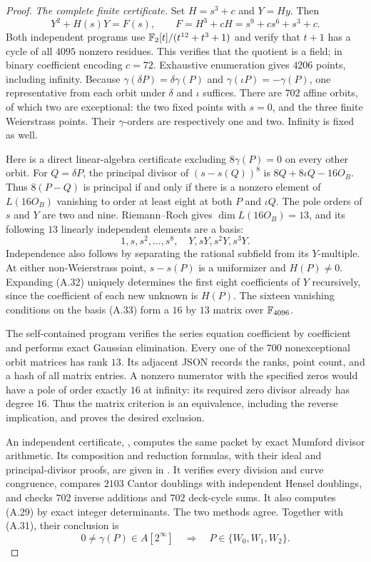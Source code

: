\begin{proof}
\emph{The complete finite certificate.}
Set $H=s^3+c$ and $Y=Hy$. Then
\[
 Y^2+H(s)Y=F(s),\qquad
 F=H^3+cH=s^9+c s^6+s^3+c.                              \tag{A.32}
\]
Both independent programs use
$\mathbb F_2[t]/(t^{12}+t^3+1)$ and verify that $t+1$ has a
cycle of all $4095$ nonzero residues. This verifies that
the quotient is a field; in binary coefficient encoding
$c=72$. Exhaustive enumeration gives $4206$ points,
including infinity. Because $\gamma(\delta P)=\delta\gamma(P)$
and $\gamma(\iota P)=-\gamma(P)$, one representative
from each orbit under $\delta$ and $\iota$ suffices.
There are $702$ affine orbits, of which two are exceptional:
the two fixed points with $s=0$, and the three finite
Weierstrass points. Their $\gamma$-orders are respectively
one and two. Infinity is fixed as well.

Here is a direct linear-algebra certificate excluding
$8\gamma(P)=0$ on every other orbit. For $Q=\delta P$,
the principal divisor of $(s-s(Q))^8$ is
$8Q+8\iota Q-16O_B$. Thus $8(P-Q)$ is principal
if and only if there is a nonzero element of
$L(16O_B)$ vanishing to order at least eight at both
$P$ and $\iota Q$. The pole orders of $s$ and $Y$ are
two and nine. Riemann--Roch gives $\dim L(16O_B)=13$,
and its following $13$ linearly independent elements
are a basis:
\[
 1,s,s^2,\ldots,s^8,\quad Y,sY,s^2Y,s^3Y.              \tag{A.33}
\]
Independence also follows by separating the rational
subfield from its $Y$-multiple. At either non-Weierstrass
point, $s-s(P)$ is a uniformizer and $H(P)\ne0$.
Expanding (A.32) uniquely determines the first eight
coefficients of $Y$ recursively, since the coefficient
of each new unknown is $H(P)$. The sixteen vanishing
conditions on the basis (A.33) form a $16$ by $13$
matrix over $\mathbb F_{4096}$.

The self-contained program
 verifies
the series equation coefficient by coefficient and
performs exact Gaussian elimination. Every one of the
$700$ nonexceptional orbit matrices has rank $13$.
Its adjacent JSON records the ranks, point count, and
a hash of all matrix entries. A nonzero numerator with
the specified zeros would have a pole of order exactly
$16$ at infinity: its required zero divisor already
has degree $16$. Thus the matrix criterion is an
equivalence, including the reverse implication, and
proves the desired exclusion.

An independent certificate,
, computes the
same packet by exact Mumford divisor arithmetic. Its
composition and reduction formulas, with their ideal
and principal-divisor proofs, are given in
. It verifies
every division and curve congruence, compares $2103$
Cantor doublings with independent Hensel doublings,
and checks $702$ inverse additions and $702$ deck-cycle
sums. It also computes (A.29) by exact integer
determinants. The two methods agree. Together with
(A.31), their conclusion is
\[
 0\ne\gamma(P)\in A[2^\infty]
                  \quad\Longrightarrow\quad
                  P\in\{W_0,W_1,W_2\}.                \tag{A.34}
\]


\end{proof}
